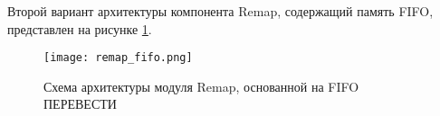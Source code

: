 Второй вариант архитектуры компонента Remap, содержащий память FIFO, представлен на рисунке \ref{fig:remap_fifo}.\par
\begin{figure}[ht]
    \centering
    \texttt{[image: remap\_fifo.png]}
    \caption{Схема архитектуры модуля Remap, основанной на FIFO ПЕРЕВЕСТИ}
    \label{fig:remap_fifo}
\end{figure}\par

